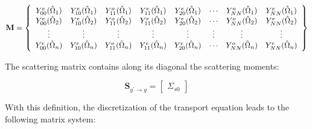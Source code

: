 \documentclass[10pt]{article}
\newcommand{\hO}{\hat{\Omega}}
\begin{document}
\begin{flushleft}
\begin{equation}
\textbf{M}=\left\{
\begin{array}{*{13}c}
Y_{00}^e(\hO  _1)  & Y_{10}^e(\hO  _1) & Y_{11}^o(\hO  _1) & Y_{11}^e(\hO  _1) & Y_{20}^e(\hO  _1) & \cdots & Y_{NN}^o(\hO  _1) & Y_{NN}^e(\hO  _1)\\
Y_{00}^e(\hO  _2)  & Y_{10}^e(\hO  _2) & Y_{11}^o(\hO  _2) & Y_{11}^e(\hO  _2) & Y_{20}^e(\hO  _2) & \cdots & Y_{NN}^o(\hO  _2) & Y_{NN}^e(\hO  _2)\\
\vdots & \vdots & \vdots & \vdots & \vdots & \vdots & \vdots & \vdots \\
Y_{00}^e(\hO  _n) & Y_{10}^e(\hO  _n) & Y_{11}^o(\hO  _n) & Y_{11}^e(\hO  _n) & Y_{20}^e(\hO  _n) & \cdots & Y_{NN}^o(\hO  _n) & Y_{NN}^e(\hO  _n)\\
\end{array}\right\}
\end{equation}

The scattering matrix contains along its diagonal the scattering moments:

\begin{equation}
\textbf{S}_{g^{'}\rightarrow g}=\begin{bmatrix}
\Sigma_{s0}
\end{bmatrix}
\end{equation}

With this definition, the discretization of the transport equation leads to the following matrix system:


\end{flushleft}
\end{document}
